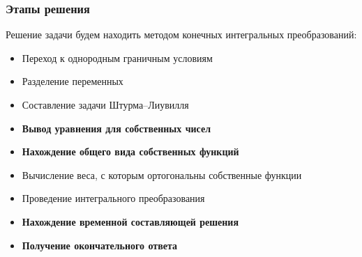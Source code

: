 \documentclass[10pt,pdf,hyperref={unicode}]{beamer}
\begin{document}
\begin{frame}
  \frametitle{Этапы решения}
  Решение задачи будем находить методом конечных интегральных преобразований:
  \begin{itemize}
    \item Переход к однородным граничным условиям
    \item Разделение переменных
    \item Составление задачи Штурма--Лиувилля
    \item {\bf Вывод уравнения для собственных чисел}
    \item {\bf Нахождение общего вида собственных функций}
    \item Вычисление веса, с которым ортогональны собственные функции
    \item Проведение интегрального преобразования
    \item {\bf Нахождение временной составляющей решения}
    \item {\bf Получение окончательного ответа}
  \end{itemize}
\end{frame}
\end{document}
